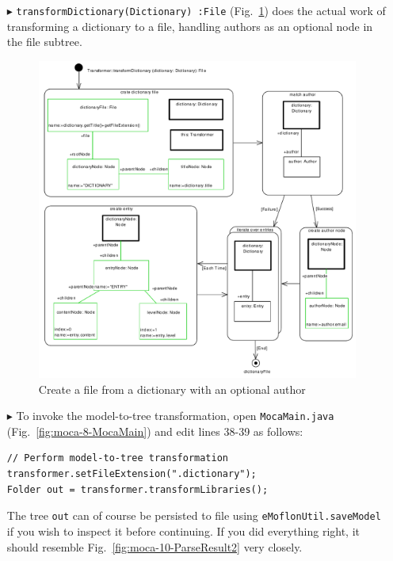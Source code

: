 \begin{enumerate}
\item[$\blacktriangleright$] \texttt{transformDictionary(Dictionary)~:File} (Fig.~\ref{fig:moca-transformDictionary}) does the actual work of transforming a dictionary to a file, handling authors as an optional node in the file subtree.
\begin{figure}[!htbp]
\begin{center}
 \includegraphics[width=\textwidth]{pics/moca/4ModelToMocaTree/transformDictionary}
  \caption{Create a file from a dictionary with an optional author} 
  \label{fig:moca-transformDictionary}
\end{center}
\end{figure} 
\item[$\blacktriangleright$] To invoke the model-to-tree transformation, open \texttt{MocaMain.java} (Fig.~\ref{fig:moca-8-MocaMain}) and edit lines 38-39 as follows:
\begin{verbatim}
// Perform model-to-tree transformation
transformer.setFileExtension(".dictionary");
Folder out = transformer.transformLibraries();
\end{verbatim}
The tree \texttt{out} can of course be persisted to file using \texttt{eMoflonUtil.saveModel} if you wish to inspect it before continuing.
If you did everything right, it should resemble Fig.~\ref{fig:moca-10-ParseResult2} very closely. 
\end{enumerate}